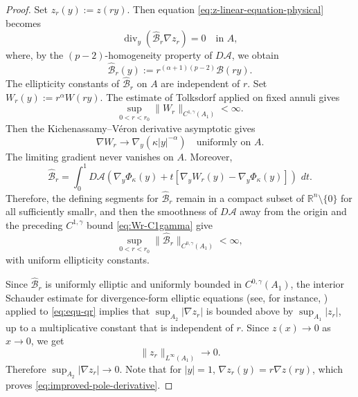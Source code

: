 \documentclass[reqno,12pt]{amsart}
\numberwithin{equation}{section}
\theoremstyle{remark}
\newcommand{\R}{\mathbb R}
\newcommand{\dd}{\,d}
\newcommand{\Acal}{\mathcal A}
\begin{document}
\begin{proof}
Set $z_r(y):=z(ry)$.  Then equation
\eqref{eq:z-linear-equation-physical} becomes
\begin{equation}\label{eq:equ-qr}
\operatorname{div}_y(\widehat{\mathcal B}_r\nabla z_r)=0
\quad\text{in } A,
\end{equation}
where, by the $(p-2)$-homogeneity property of $D\Acal$, we obtain
$$
\widehat{\mathcal B}_r(y):= r^{(\alpha+1)(p-2)} \mathcal B(ry).
$$
The ellipticity constants of $\widehat{\mathcal B}_r$ on $A$ are independent of $r$.  Set $W_r(y):=r^\alpha W(ry)$. 
The estimate of Tolksdorf  \cite{T1984} applied on fixed annuli gives
\begin{equation}\label{eq:Wr-C1gamma}
\sup_{0<r<r_0} \|W_r\|_{C^{1,\gamma}(A_1)}<\infty.
\end{equation}
Then the Kichenassamy--V\'eron derivative asymptotic gives
$$
\nabla W_r\to\nabla_y(\kappa|y|^{-\alpha}) \quad\text{uniformly on }A.
$$
The limiting gradient never vanishes on $A$. Moreover,
$$
\widehat{\mathcal B}_r
=\int_0^1 D\Acal\!\left( \nabla_y\Phi_\kappa(y)
 +t[\nabla_yW_r(y)-\nabla_y\Phi_\kappa(y)]
\right)\,\dd t.
$$
Therefore, the defining segments for $\widehat{\mathcal B}_r$ remain in a compact subset of $\R^n\setminus\{0\}$ for all sufficiently small$r$, and then the smoothness of $D\Acal$ away from the origin and the preceding $C^{1,\gamma}$ bound \eqref{eq:Wr-C1gamma} give
\begin{equation}
\sup_{0<r<r_0} \|\widehat{\mathcal B}_r\|_{C^{0,\gamma}(A_1)}<\infty,
\end{equation}
with uniform ellipticity constants.

Since $\widehat{\mathcal B}_r$ is uniformly elliptic and uniformly bounded in $C^{0,\gamma}(A_1)$, the interior Schauder estimate for divergence-form elliptic equations (see, for instance, \cite[Chapter~8]{GT2001}) applied to \eqref{eq:equ-qr} implies that $\sup_{A_2}|\nabla z_r|$ is bounded above by $\sup_{A_1}|z_r|$, up to a multiplicative constant that is independent of $r$.
 Since $z(x)\to 0$ as $x\to 0$, we get
$$
\|z_r\|_{L^\infty(A_1)}\to 0.
$$
Therefore $\sup_{A_2}|\nabla z_r|\to 0.$
Note that for $|y|=1$, $\nabla z_r(y)=r\nabla z(ry)$, which proves
\eqref{eq:improved-pole-derivative}.


\end{proof}
\end{document}

